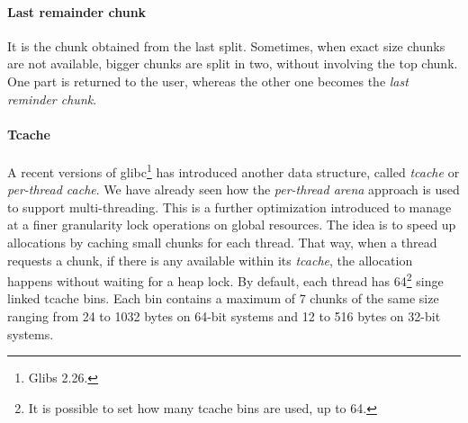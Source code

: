 \documentclass{article}
\numberwithin{equation}{subsection}
\begin{document}
\paragraph{Last remainder chunk}
It is the chunk obtained from the last split. Sometimes, when exact size chunks are not available, bigger chunks are split in two, without involving the top chunk. One part is returned to the user, whereas the other one becomes the \emph{last reminder chunk}.
\paragraph{Tcache}
A recent versions of glibc\footnote{Glibs 2.26.} has introduced another data structure, called \emph{tcache} or \emph{per-thread cache}. We have already seen how the \emph{per-thread arena} approach is used to support multi-threading. This is a further optimization introduced to manage at a finer granularity lock operations on global resources. The idea is to speed up allocations by caching small chunks for each thread. That way, when a thread requests a chunk, if there is any available within its \emph{tcache},  the allocation happens without waiting for a heap lock. By default, each thread has 64\footnote{It is possible to set how many tcache bins are used, up to 64.} singe linked tcache bins. Each bin contains a maximum of 7 chunks of the same size ranging from 24 to 1032 bytes on 64-bit systems and 12 to 516 bytes on 32-bit systems.
\end{document}
